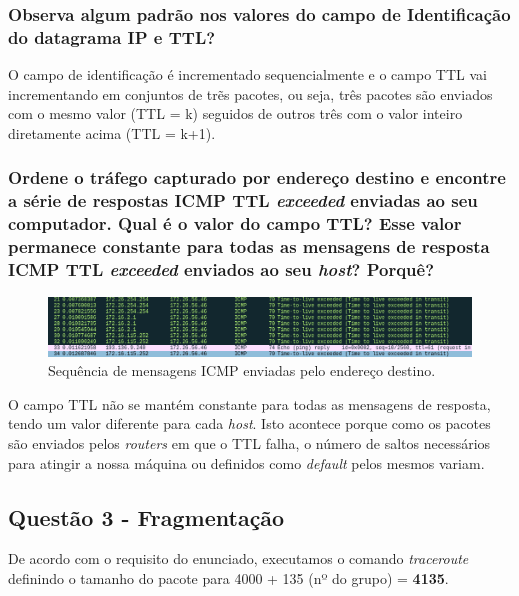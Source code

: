 \newpage
\subsubsection{Observa algum padrão nos valores do campo de Identificação do datagrama IP e TTL?}

    \par O campo de identificação é incrementado sequencialmente e o campo TTL vai incrementando em conjuntos de trẽs pacotes, ou seja, três pacotes são enviados com o mesmo valor (TTL = k) seguidos de outros três com o valor inteiro diretamente acima (TTL = k+1).
 

\subsubsection{Ordene o tráfego capturado por endereço destino e encontre a série de respostas ICMP TTL \textit{exceeded} enviadas ao seu computador. Qual é o valor do campo TTL? Esse valor permanece constante para todas as mensagens de resposta ICMP TTL \textit{exceeded} enviados ao seu \textit{host}? Porquê?}

    \begin{figure}[H]
    \centering
    \includegraphics[width=500pt]{images/ParteI/Questao2/questao2-TTLExceeded.png}
    \caption{Sequência de mensagens ICMP enviadas pelo endereço destino.} \label{questao2-SequenciaICMP-2}
    \end{figure}
    
    \par O campo TTL não se mantém constante para todas as mensagens de resposta, tendo um valor diferente para cada \textit{host}. Isto acontece porque como os pacotes são enviados pelos \textit{routers} em que o TTL falha, o número de saltos necessários para atingir a nossa máquina ou definidos como \textit{default} pelos mesmos variam.
    
    
    
\newpage
\subsection{Questão 3 - Fragmentação}

    \par De acordo com o requisito do enunciado, executamos o comando \textit{traceroute} definindo o tamanho do pacote para 4000 + 135 (nº do grupo) = \textbf{4135}.

